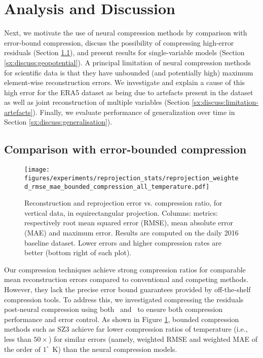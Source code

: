 \section{Analysis and Discussion}
\label{sx:discussion}

Next, we motivate the use of neural compression methods by comparison with error-bound compression, discuss the possibility of compressing high-error residuals (Section \ref{sx:discuss:error-bound}), and present results for single-variable models (Section \ref{sx:discuss:geopotential}). A principal limitation of  neural compression methods for scientific data is that they have unbounded (and potentially high) maximum element-wise reconstruction errors. We investigate and explain a cause of this high error for the ERA5 dataset as being due to artefacts present in the dataset as well as joint reconstruction of multiple variables (Section \ref{sx:discuss:limitation-artefacts}). Finally, we evaluate performance of generalization over time in Section \ref{sx:discuss:generalisation}).


\subsection{Comparison with error-bounded compression}
\label{sx:discuss:error-bound}

\begin{figure}
    \centering
    \texttt{[image: figures/experiments/reprojection\_stats/reprojection\_weighted\_rmse\_mae\_bounded\_compression\_all\_temperature.pdf]}
    \hfill
    \caption{Reconstruction and reprojection error vs. compression ratio, for vertical data, in equirectangular projection. Columns: metrics: respectively root mean squared error (RMSE), mean absolute error (MAE) and maximum error. Results are computed on the daily 2016 baseline dataset. Lower errors and higher compression rates are better (bottom right of each plot).}
    \label{fig:reprojection_error_vs_cr_bounded_compression}
\end{figure}

Our compression techniques achieve strong compression ratios for comparable mean reconstruction errors compared to conventional and competing methods.
However, they lack the precise error bound guarantees provided by off-the-shelf compression tools. 
To address this, we investigated compressing the residuals post-neural compression using both~\citet{sz3_algo} and~\citet{zfpy_2014} to ensure both compression performance and error control. As shown in Figure \ref{fig:reprojection_error_vs_cr_bounded_compression}, bounded compression methods such as SZ3 achieve far lower compression ratios of temperature (i.e., less than $50\times$) for similar errors (namely, weighted RMSE and weighted MAE of the order of $1^\circ$~K) than the neural compression models.


